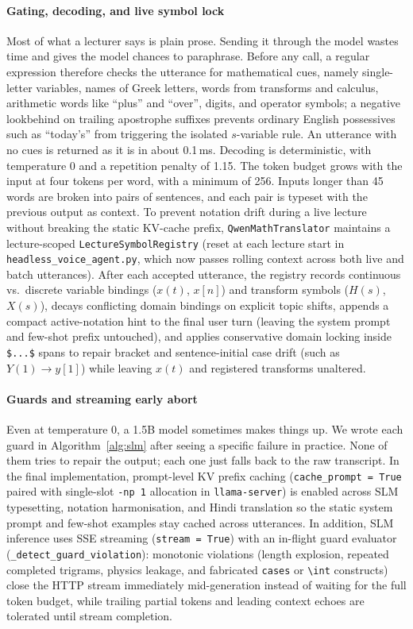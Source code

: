 \documentclass[11pt,a4paper,oneside]{report}
\theoremstyle{definition}
\newcommand{\code}[1]{\texttt{\small #1}}
\begin{document}
\paragraph{Gating, decoding, and live symbol lock} Most of what a lecturer says is plain prose. Sending it through the model wastes time and gives the model chances to paraphrase. Before any call, a regular expression therefore checks the utterance for mathematical cues, namely single-letter variables, names of Greek letters, words from transforms and calculus, arithmetic words like ``plus'' and ``over'', digits, and operator symbols; a negative lookbehind on trailing apostrophe suffixes prevents ordinary English possessives such as ``today's'' from triggering the isolated $s$-variable rule. An utterance with no cues is returned as it is in about 0.1\,ms. Decoding is deterministic, with temperature 0 and a repetition penalty of 1.15. The token budget grows with the input at four tokens per word, with a minimum of 256. Inputs longer than 45 words are broken into pairs of sentences, and each pair is typeset with the previous output as context. To prevent notation drift during a live lecture without breaking the static KV-cache prefix, \code{QwenMathTranslator} maintains a lecture-scoped \code{LectureSymbolRegistry} (reset at each lecture start in \code{headless\_voice\_agent.py}, which now passes rolling context across both live and batch utterances). After each accepted utterance, the registry records continuous vs.\ discrete variable bindings ($x(t)$, $x[n]$) and transform symbols ($H(s)$, $X(s)$), decays conflicting domain bindings on explicit topic shifts, appends a compact active-notation hint to the final user turn (leaving the system prompt and few-shot prefix untouched), and applies conservative domain locking inside \verb|$...$| spans to repair bracket and sentence-initial case drift (such as $Y(1) \to y[1]$) while leaving $x(t)$ and registered transforms unaltered.

\paragraph{Guards and streaming early abort} Even at temperature 0, a 1.5B model sometimes makes things up. We wrote each guard in Algorithm~\ref{alg:slm} after seeing a specific failure in practice. None of them tries to repair the output; each one just falls back to the raw transcript. In the final implementation, prompt-level KV prefix caching (\code{cache\_prompt = True} paired with single-slot \code{-np 1} allocation in \code{llama-server}) is enabled across SLM typesetting, notation harmonisation, and Hindi translation so the static system prompt and few-shot examples stay cached across utterances. In addition, SLM inference uses SSE streaming (\code{stream = True}) with an in-flight guard evaluator (\code{\_detect\_guard\_violation}): monotonic violations (length explosion, repeated completed trigrams, physics leakage, and fabricated \code{cases} or \verb|\int| constructs) close the HTTP stream immediately mid-generation instead of waiting for the full token budget, while trailing partial tokens and leading context echoes are tolerated until stream completion.
\end{document}
